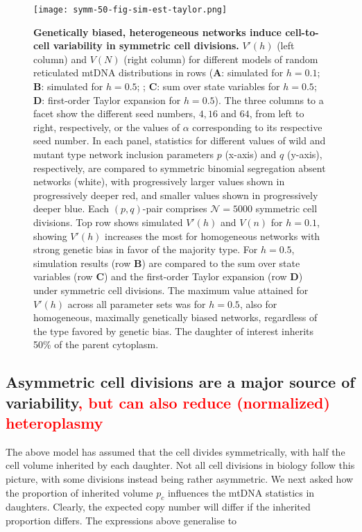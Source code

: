 \documentclass{article}
\begin{document}
\begin{figure}
\centering
\texttt{[image: symm-50-fig-sim-est-taylor.png]}
\caption{\textbf{Genetically biased, heterogeneous networks induce cell-to-cell variability in symmetric cell divisions.} $V'(h)$ (left column) and $V(N)$ (right column) for different models of random reticulated mtDNA distributions in rows (\textbf{A}: simulated for $h=0.1$; \textbf{B}: simulated for $h=0.5$; ; \textbf{C}: sum over state variables for $h=0.5$; \textbf{D}: first-order Taylor expansion for $h=0.5$). The three columns to a facet show the different seed numbers, $4, 16$ and $64$, from left to right, respectively, or the values of $\alpha$ corresponding to its respective seed number. In each panel, statistics for different values of wild and mutant type network inclusion parameters $p$ (x-axis) and $q$ (y-axis), respectively, are compared to symmetric binomial segregation absent networks (white), with progressively larger values shown in progressively deeper red, and smaller values shown in progressively deeper blue. Each $(p,q)$-pair comprises $\mathcal{N}=5000$ symmetric cell divisions. Top row shows simulated $V'(h)$ and $V(n)$ for $h=0.1$, showing $V'(h)$ increases the most for homogeneous networks with strong genetic bias in favor of the majority type. For $h=0.5$, simulation results (row \textbf{B}) are compared to the sum over state variables (row \textbf{C}) and the first-order Taylor expansion (row \textbf{D}) under symmetric cell divisions. The maximum value attained for $V'(h)$ across all parameter sets was for $h=0.5$, also for homogeneous, maximally genetically biased networks, regardless of the type favored by genetic bias. The daughter of interest inherits 50\% of the parent cytoplasm.}\label{fig:sim-model-compare-nonrep}
\end{figure}

\subsection{Asymmetric cell divisions are a major source of variability\textcolor{red}{, but can also reduce (normalized) heteroplasmy}}
The above model has assumed that the cell divides symmetrically, with half the cell volume inherited by each daughter. Not all cell divisions in biology follow this picture, with some divisions instead being rather asymmetric. We next asked how the proportion of inherited volume $p_c$ influences the mtDNA statistics in daughters. Clearly, the expected copy number will differ if the inherited proportion differs. The expressions above generalise to
\end{document}
